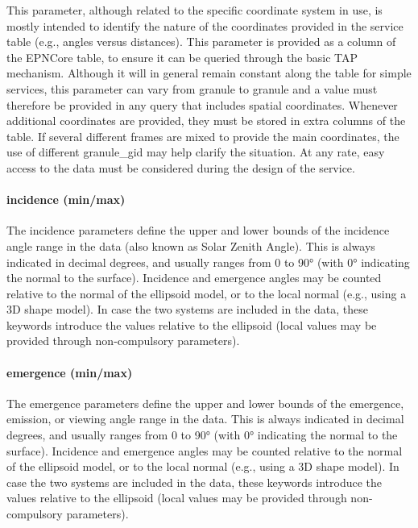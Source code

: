 \documentclass[11pt,a4paper]{ivoa}
\begin{document}
This parameter, although related to the specific coordinate system in use,
is mostly intended to identify the nature of the coordinates provided in
the service table (e.g., angles versus distances). This parameter is
provided as a column of the EPNCore table, to ensure it can be queried
through the basic TAP mechanism. Although it will in general remain
constant along the table for simple services, this parameter can vary from
granule to granule and a value must therefore be provided in any query
that includes spatial coordinates. Whenever additional coordinates are
provided, they must be stored in extra columns of the table. If several
different frames are mixed to provide the main coordinates, the use of
different granule\_gid may help clarify the situation. At any rate, easy
access to the data must be considered during the design of the service.

\paragraph{incidence (min/max)}

The incidence parameters define the upper and lower bounds of the
incidence angle range in the data (also known as Solar Zenith Angle).
This is always indicated in decimal degrees, and usually ranges from 0 to
90° (with 0° indicating the normal to the surface). Incidence and
emergence angles may be counted relative to the normal of the ellipsoid
model, or to the local normal (e.g., using a 3D shape model). In case
the two systems are included in the data, these keywords introduce the
values relative to the ellipsoid (local values may be provided through
non-compulsory parameters).

\paragraph{emergence (min/max)}

The emergence parameters define the upper and lower bounds of the
emergence, emission, or viewing angle range in the data. This is always
indicated in decimal degrees, and usually ranges from 0 to 90° (with
0° indicating the normal to the surface). Incidence and emergence angles
may be counted relative to the normal of the ellipsoid model, or to the
local normal (e.g., using a 3D shape model). In case the two systems
are included in the data, these keywords introduce the values relative
to the ellipsoid (local values may be provided through non-compulsory
parameters).
\end{document}

